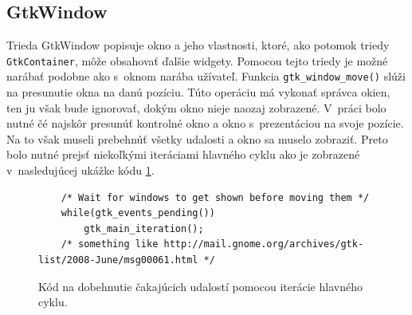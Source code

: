 \documentclass[12pt,oneside,final]{fithesis2}
\begin{document}
\subsection{GtkWindow}
Trieda GtkWindow popisuje okno a jeho vlastnosti, ktoré, ako potomok triedy \texttt{GtkContainer}, môže obsahovať ďalšie widgety. Pomocou tejto triedy je možné narábať podobne ako s~oknom narába užívateľ. Funkcia \texttt{gtk\_window\_move()} slúži na presunutie okna na danú pozíciu. Túto operáciu má vykonať správca okien, ten ju však bude ignorovať, dokým okno nieje naozaj zobrazené. V~práci bolo nutné čé najskôr presunúť kontrolné okno a okno s~prezentáciou na svoje pozície. Na to však museli prebehnúť všetky udalosti a okno sa muselo zobraziť. Preto bolo nutné prejsť niekoľkými iteráciami hlavného cyklu ako je zobrazené v~nasledujúcej ukážke kódu \ref{iterate}.
\begin{figure}[hbtp]
\begin{tiny}
\begin{verbatim}
	/* Wait for windows to get shown before moving them */
	while(gtk_events_pending())
		gtk_main_iteration();
	/* something like http://mail.gnome.org/archives/gtk-list/2008-June/msg00061.html */
\end{verbatim}
\end{tiny}
\caption{Kód na dobehnutie čakajúcich udalostí pomocou iterácie hlavného cyklu.}
\label{iterate}
\end{figure}
\end{document}
